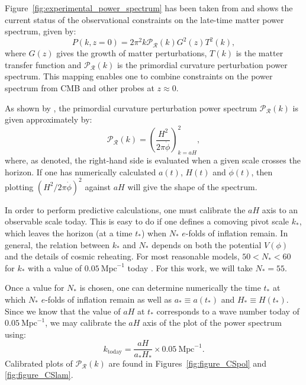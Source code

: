 Figure~\ref{fig:experimental_power_spectrum} has been taken from \citet{hlozek_atacama_2012} and shows the current status of the observational constraints on the late-time matter power spectrum, given by:
%
\begin{equation}
  P(k,z=0) = 2\pi^2 k \mathcal{P}_\mathcal{R}(k) G^2(z) T^2(k),
\end{equation}
%
where \(G(z)\) gives the growth of matter perturbations, \(T(k)\) is the matter transfer function and \(\mathcal{P}_\mathcal{R}(k)\) is the primordial curvature perturbation power spectrum. This mapping enables one to combine constraints on the power spectrum from CMB and other probes at \(z\approx 0\).




As shown by \citet{liddle_cosmological_2000}, the primordial curvature perturbation power spectrum \(\mathcal{P}_{\mathcal{R}}(k)\) is given approximately by:
%
\begin{equation}
  \mathcal{P}_{\mathcal{R}}(k)
  =
  {\left(\frac{H^2}{2\pi\dot{\phi}}\right)}^2_{k=a H},
  \label{eqn:curvature_power_spectrum}
\end{equation}
%
where, as denoted, the right-hand side is evaluated when a given scale crosses the horizon. If one has numerically calculated \(a(t)\), \(H(t)\) and \(\dot{\phi}(t)\), then plotting \({\left(H^2/ 2\pi\dot{\phi}\right)}^2\) against \(aH\) will give the shape of the spectrum.

In order to perform predictive calculations, one must calibrate the \(aH\) axis to an observable scale today. This is easy to do if one defines a comoving pivot scale \(k_*\), which leaves the horizon (at a time \(t_*\)) when \(N_*\) \(e\)-folds of inflation remain. In general, the relation between \(k_*\) and \(N_*\) depends on both the potential \(V(\phi)\) and the details of cosmic reheating. For most reasonable models, \(50<N_*<60\)  for \(k_*\) with a value of \(0.05\:\mathrm{Mpc}^{-1}\) today \citep{planck_collaboration_planck_2013-1}. For this work, we will take \(N_*=55\). 

Once a value for \(N_*\) is chosen, one can determine numerically the time \(t_*\) at which \(N_*\) \(e\)-folds of inflation remain as well as \(a_*\equiv a(t_*)\) and \(H_*\equiv H(t_*)\). Since we know that the value of \(aH\) at \(t_*\) corresponds to a wave number today of \(0.05\:\mathrm{Mpc}^{-1}\), we may calibrate the \(aH\) axis of the plot of the power spectrum using:
%
\begin{equation}
  k_\mathrm{today} 
  = 
  \frac{aH}{a_*H_*}\times0.05\:\mathrm{Mpc}^{-1}.
\end{equation}
%
Calibrated plots of \(\mathcal{P}_\mathcal{R}(k)\) are found in Figures~\ref{fig:figure_CSpol} and \nolinebreak\ref{fig:figure_CSlam}. 


